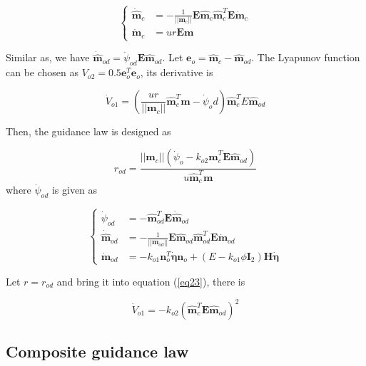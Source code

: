 \documentclass[a4paper, 10pt, conference]{ieeeconf}      %
\begin{document}
\begin{equation}\label{eq22}
	\left\{
	\begin{aligned}
		\dot{\hat{\bm{m}}}_{c}&=-\frac{1}{||\bm{m}_{c}||}\bm{E}\hat{\bm{m}}_{c}\hat{\bm{m}}^T_{c}\bm{E}\dot{\bm{m}}_{c}\\
		\dot{\bm{m}}_{c}&=ur\bm{E}\bm{m}
	\end{aligned}
	\right.
\end{equation}

Similar as, we have $\dot{\hat{\bm{m}}}_{od}=\dot{\psi}_{od}\bm{E}\hat{\bm{m}}_{od}$. Let $\bm{e}_o=\hat{\bm{m}}_{c}-\hat{\bm{m}}_{od}$. The Lyapunov function can be chosen as $V_{o2}=0.5\bm{e}^T_o\bm{e}_o$, its derivative is

\begin{equation}\label{eq23}
	\dot{V}_{o1}=(\frac{ur}{||\bm{m}_c||}\hat{\bm{m}}^T_c\bm{m}-\dot{\psi}_od)\hat{\bm{m}}^T_cE\hat{\bm{m}}_{od}
\end{equation}

Then, the guidance law is designed as

\begin{equation}\label{eq24}
	r_{od}=\frac{||\bm{m}_c||(\dot{\psi}_o-k_{o2}\hat{\bm{m}}^T_c\bm{E}\hat{\bm{m}}_{od})}{u\hat{\bm{m}}^T_c\bm{m}}
\end{equation}
where $\dot{\psi}_{od}$ is given as

\begin{equation}\label{eq25}
	\left\{
	\begin{aligned}
		\dot{\psi}_{od}&=-\hat{\bm{m}}^T_{od}\bm{E}\dot{\hat{\bm{m}}}_{od}\\
		\dot{\hat{\bm{m}}}_{od}&=-\frac{1}{||\bm{m}_{od}||}\bm{E}\hat{\bm{m}}_{od}\hat{\bm{m}}^T_{od}\bm{E}\dot{\bm{m}}_{od}\\
		\dot{\bm{m}}_{od}&=-k_{o1}\bm{n}_{o}^T\dot{\bm{\eta}}\bm{n}_o+(E-k_{o1}\phi \bm{I}_2)\bm{H}\dot{\bm{\eta}}
	\end{aligned}
	\right.
\end{equation}

Let $r=r_{od}$ and bring it into equation (\ref{eq23}), there is
 
\begin{equation}\label{eq26}
	\dot{V}_{o1}=-k_{o2}(\hat{\bm{m}}^T_c\bm{E}\hat{\bm{m}}_{od})^2
\end{equation}

\subsection{Composite guidance law}
\end{document}
